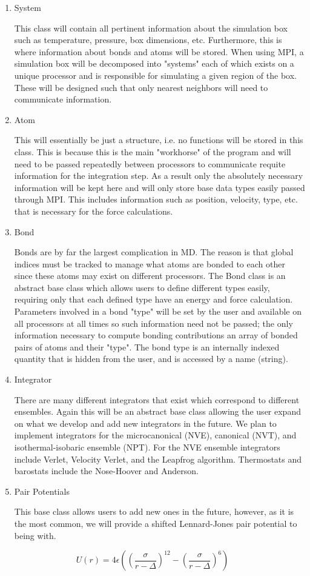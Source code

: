 \documentclass[10pt]{article}
\begin{document}
\begin{enumerate}
	\item{System} \par This class will contain all pertinent information about the simulation box such as temperature, pressure, box dimensions, etc.  Furthermore, this is where information about bonds and atoms will be stored.  When using MPI, a simulation box will be decomposed into "systems" each of which exists on a unique processor and is responsible for simulating a given region of the box.  These will be designed such that only nearest neighbors will need to communicate information.
	\item{Atom} \par This will essentially be just a structure, i.e. no functions will be stored in this class.  This is because this is the main "workhorse" of the program and will need to be passed repeatedly between processors to communicate requite information for the integration step.  As a result only the absolutely necessary information will be kept here and will only store base data types easily passed through MPI.  This includes information such as position, velocity, type, etc. that is necessary for the force calculations.
	\item{Bond} \par Bonds are by far the largest complication in MD.  The reason is that global indices must be tracked to manage what atoms are bonded to each other since these atoms may exist on different processors.  The Bond class is an abstract base class which allows users to define different types easily, requiring only that each defined type have an energy and force calculation.  Parameters involved in a bond "type" will be set by the user and available on all processors at all times so such information need not be passed; the only information necessary to compute bonding contributions an array of bonded pairs of atoms and their "type".  The bond type is an internally indexed quantity that is hidden from the user, and is accessed by a name (string).
	\item{Integrator} \par There are many different integrators that exist which correspond to different ensembles.  Again this will be an abstract base class allowing the user expand on what we develop and add new integrators in the future.  We plan to implement integrators for the microcanonical  (NVE), canonical (NVT), and isothermal-isobaric ensemble (NPT).  For the NVE ensemble integrators include Verlet, Velocity Verlet, and the Leapfrog algorithm.  Thermostats and barostats include the Nose-Hoover and Anderson.
	\item{Pair Potentials} \par This base class allows users to add new ones in the future, however, as it is the most common, we will provide a shifted Lennard-Jones pair potential to being with.
\end{enumerate}
\begin{equation}
	U(r) = 4\epsilon \left( \left( \frac{\sigma}{r-\Delta} \right)^{12} - \left( \frac{\sigma}{r - \Delta} \right)^{6} \right)
\end{equation}
\end{document}
